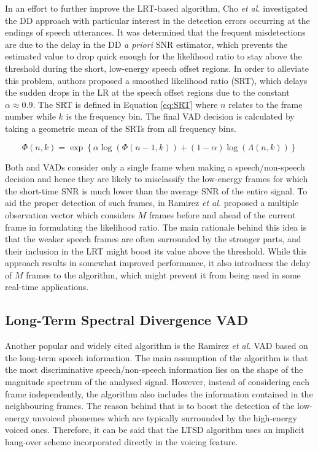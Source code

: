In an effort to further improve the LRT-based algorithm, Cho \emph{et al.} \cite{Cho} investigated the DD approach with particular interest in the detection errors occurring at the endings of speech utterances. It was determined that the frequent misdetections are due to the delay in the DD \emph{a priori} SNR estimator, which prevents the estimated value to drop quick enough for the likelihood ratio to stay above the threshold during the short, low-energy speech offset regions. In order to alleviate this problem, authors proposed a smoothed likelihood ratio (SRT), which delays the sudden drops in the LR at the speech offset regions due to the constant $\alpha \approx 0.9$. The SRT is defined in Equation \ref{eq:SRT} where $n$ relates to the frame number while $k$ is the frequency bin. The final VAD decision is calculated by taking a geometric mean of the SRTs from all frequency bins.

\begin{equation}
\Phi (n,k) = \exp \left\{ \alpha \log \left( \Phi (n-1,k) \right) + (1-\alpha) \log \left( \Lambda (n,k) \right) \right\}
\label{eq:SRT}
\end{equation}

Both \cite{Sohn} and \cite{Cho} VADs consider only a single frame when making a speech/non-speech decision and hence they are likely to misclassify the low-energy frames for which the short-time SNR is much lower than the average SNR of the entire signal. To aid the proper detection of such frames, in \cite{RamirezMulti} Ramirez \emph{et al.} proposed a multiple observation vector which considers $M$ frames before and ahead of the current frame in formulating the likelihood ratio. The main rationale behind this idea is that the weaker speech frames are often surrounded by the stronger parts, and their inclusion in the LRT might boost its value above the threshold. While this approach results in somewhat improved performance, it also introduces the delay of $M$ frames to the algorithm, which might prevent it from being used in some real-time applications.

\subsection{Long-Term Spectral Divergence VAD}

Another popular and widely cited algorithm is the Ramirez \emph{et al.} \cite{LTSD} VAD based on the long-term speech information. The main assumption of the algorithm is that the most discriminative speech/non-speech information lies on the shape of the magnitude spectrum of the analysed signal. However, instead of considering each frame independently, the algorithm also includes the information contained in the neighbouring frames. The reason behind that is to boost the detection of the low-energy unvoiced phonemes which are typically surrounded by the high-energy voiced ones. Therefore, it can be said that the LTSD algorithm uses an implicit hang-over scheme incorporated directly in the voicing feature.

